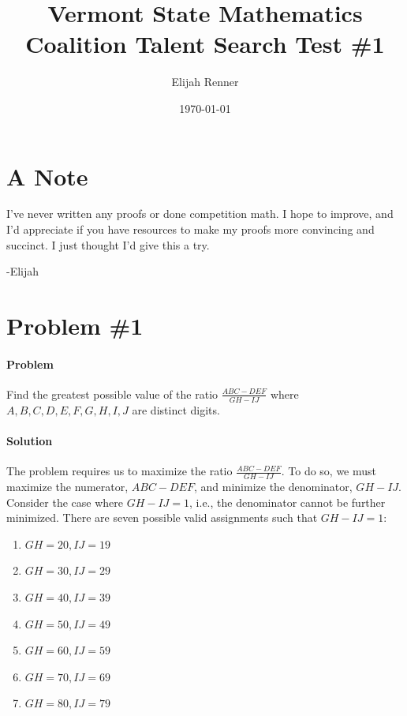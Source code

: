 \documentclass[10pt]{article}
\title{Vermont State Mathematics Coalition Talent Search Test \#1}
\author{Elijah Renner}
\date{\today}
\theoremstyle{plain}
\theoremstyle{definition}
\theoremstyle{remark}
\begin{document}
\maketitle
\tableofcontents

\section*{A Note}

I've never written any proofs or done competition math. I hope to improve, and I'd appreciate if you have resources to make my proofs more convincing and succinct. I just thought I'd give this a try.

-Elijah

\section{Problem \#1}

\paragraph{Problem} Find the greatest possible value of the ratio \(\frac{ABC-DEF}{GH-IJ}\) where \(A,B,C,D,E,F,G,H,I,J\) are distinct digits.

\paragraph{Solution} The problem requires us to maximize the ratio \(\frac{ABC-DEF}{GH-IJ}\). To do so, we must maximize the numerator, \(ABC-DEF\), and minimize the denominator, \(GH-IJ\).
Consider the case where \(GH-IJ=1\), i.e., the denominator cannot be further minimized. There are seven possible valid assignments such that \(GH-IJ=1\):\

\begin{enumerate}
\item \(GH=20, IJ=19\)
\item \(GH=30, IJ=29\)
\item \(GH=40, IJ=39\)
\item \(GH=50, IJ=49\)
\item \(GH=60, IJ=59\)
\item \(GH=70, IJ=69\)
\item \(GH=80, IJ=79\)	
\end{enumerate}
\end{document}
